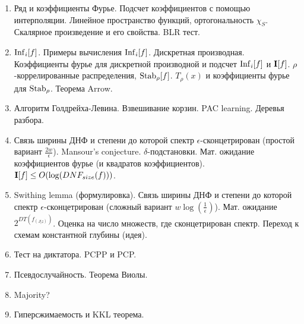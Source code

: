 \begin{enumerate}
    \item Ряд и коэффициенты Фурье. Подсчет коэффициентов с помощью интерполяции. Линейное пространство функций, ортогональность
        $\chi_S$. Скалярное произведение и его свойства. BLR тест.
    \item $\mathrm{Inf}_i[f]$. Примеры вычисления $\mathrm{Inf}_i[f]$. Дискретная производная. Коэффициенты фурье для дискретной производной и 
        подсчет $\mathrm{Inf}_i[f]$ и $\mathbf{I}[f]$. $\rho$-коррелированные распределения, $\mathrm{Stab}_{\rho}[f]$. $T_{\rho}(x)$ и коэффициенты фурье
        для $\mathrm{Stab}_{\rho}$. Теорема Arrow.
    \item Алгоритм Голдрейха-Левина. Взвешивание корзин. PAC learning. Деревья разбора.
    \item Связь ширины ДНФ и степени до которой спектр $\epsilon$-сконцетрирован (простой вариант
        $\frac{2w}{\epsilon}$). Mansour's conjecture. $\delta$-подстановки. Мат. ожидание коэффициентов фурье (и квадратов
        коэффициентов). $\mathbf{I}[f] \le O(\log(DNF_{size}(f)))$.
    \item Swithing lemma (формулировка). Связь ширины ДНФ и степени до которой спектр $\epsilon$-сконцетрирован (сложный вариант
        $w \log(\frac{1}{\epsilon})$). Мат. ожидание $2^{DT(f_{(J|z)})}$. Оценка на число множеств, где сконцетрирован
        спектр. Переход к схемам константной глубины (идея).
    \item Тест на диктатора. PCPP и PCP.
    \item Псевдослучайность. Теорема Виолы.
    \item Majority?
    \item Гиперсжимаемость и KKL теорема.
\end{enumerate}